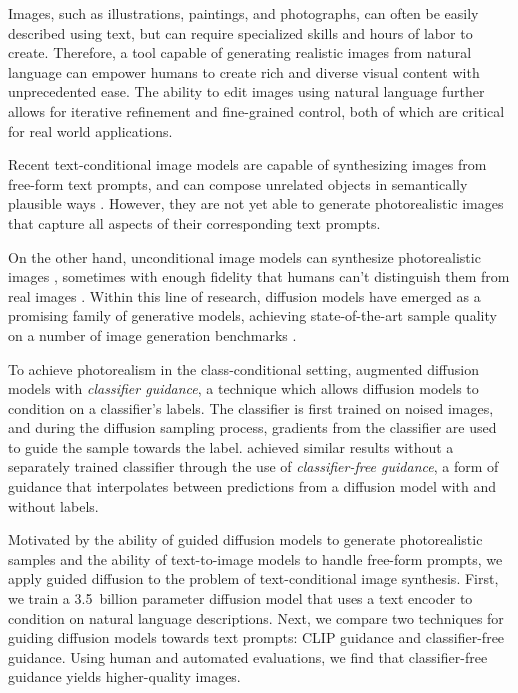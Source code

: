 \documentclass{article}
\begin{document}
Images, such as illustrations, paintings, and photographs, can often be easily described using text, but can require specialized skills and hours of labor to create. Therefore, a tool capable of generating realistic images from natural language can empower humans to create rich and diverse visual content with unprecedented ease. The ability to edit images using natural language further allows for iterative refinement and fine-grained control, both of which are critical for real world applications.

Recent text-conditional image models are capable of synthesizing images from free-form text prompts, and can compose unrelated objects in semantically plausible ways \citep{attngan,dmgan,dfgan,dalle,xmcgan}. However, they are not yet able to generate photorealistic images that capture all aspects of their corresponding text prompts.

On the other hand, unconditional image models can synthesize photorealistic images \cite{biggan,stylegan,stylegan2,vqvae2}, sometimes with enough fidelity that humans can't distinguish them from real images \cite{zhou2019hype}. Within this line of research, diffusion models \cite{dickstein,scorematching} have emerged as a promising family of generative models, achieving state-of-the-art sample quality on a number of image generation benchmarks \citep{ddpm,sotapaper,cascaded}.

To achieve photorealism in the class-conditional setting, \citet{sotapaper} augmented diffusion models with \textit{classifier guidance}, a technique which allows diffusion models to condition on a classifier's labels. The classifier is first trained on noised images, and during the diffusion sampling process, gradients from the classifier are used to guide the sample towards the label. \citet{uncond} achieved similar results without a separately trained classifier through the use of \textit{classifier-free guidance}, a form of guidance that interpolates between predictions from a diffusion model with and without labels.

Motivated by the ability of guided diffusion models to generate photorealistic samples and the ability of text-to-image models to handle free-form prompts, we apply guided diffusion to the problem of text-conditional image synthesis. First, we train a 3.5~billion parameter diffusion model that uses a text encoder to condition on natural language descriptions. Next, we compare two techniques for guiding diffusion models towards text prompts: CLIP guidance and classifier-free guidance. Using human and automated evaluations, we find that classifier-free guidance yields higher-quality images.
\end{document}
